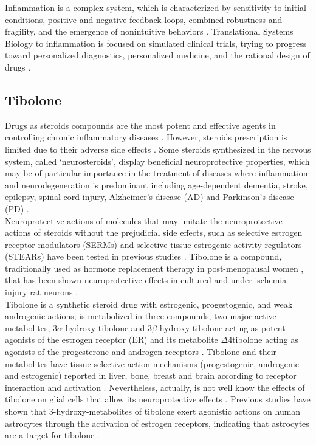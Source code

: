 Inflammation is a complex system, which is characterized by sensitivity to initial conditions, positive and negative feedback loops, combined robustness and fragility, and the emergence of nonintuitive behaviors \cite{Mi2010}. Translational Systems Biology to inflammation is focused on simulated clinical trials, trying to progress toward personalized diagnostics, personalized medicine, and the rational design of drugs \cite{Vodovotz2010}.

\subsection*{Tibolone}
Drugs as steroids compounds are the most potent and effective agents in controlling chronic inflammatory diseases \cite{Laveti2013}. However, steroids prescription is limited due to their adverse side effects \cite{Albertazzi1998}. Some steroids synthesized in the nervous system, called ‘neurosteroids’, display beneficial neuroprotective properties, which may be of particular importance in the treatment of diseases where inflammation and neurodegeneration is predominant including age-dependent dementia, stroke, epilepsy, spinal cord injury, Alzheimer’s disease (AD) and Parkinson’s disease (PD) \cite{Wojtal2006}. \\

Neuroprotective actions of molecules that may imitate the neuroprotective actions of steroids without the prejudicial side effects, such as selective estrogen receptor modulators (SERMs) and selective tissue estrogenic activity regulators (STEARs) have been tested in previous studies \cite{Kloosterboer2001,Sharma2006}. Tibolone is a compound, traditionally used as hormone replacement therapy in post-menopausal women \cite{Timmer2002}, that has been shown neuroprotective effects in cultured and under ischemia injury rat neurons \cite{Altinoz2009}.\\

Tibolone is a synthetic steroid drug with estrogenic, progestogenic, and weak androgenic actions; is metabolized in three compounds, two major active metabolites, 3$\alpha$-hydroxy tibolone and 3$\beta$-hydroxy tibolone acting as potent agonists of the estrogen receptor (ER) and its metabolite $\Delta$4tibolone acting as agonists of the progesterone and androgen receptors \cite{Kloosterboer2004}. Tibolone and their metabolites have tissue selective action mechanisms (progestogenic, androgenic and estrogenic) reported in liver, bone, breast and brain according to receptor interaction and activation \cite{Kloosterboer2001}. Nevertheless, actually, is not well know the effects of tibolone on glial cells that allow its neuroprotective effects \cite{Avila-Rodriguez2014}. Previous studies have shown that 3-hydroxy-metabolites of tibolone exert agonistic actions on human astrocytes through the activation of estrogen receptors, indicating that astrocytes are a target for tibolone \cite{Altinoz2009}.\\

